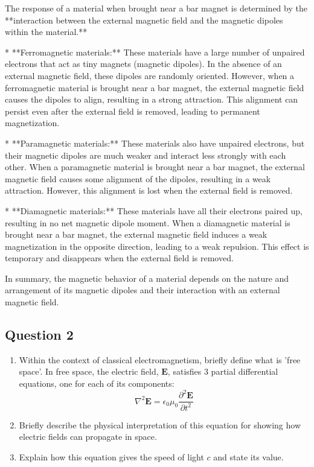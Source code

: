 \documentclass{article}
\begin{document}
The response of a material when brought near a bar magnet is determined by the **interaction between the external magnetic field and the magnetic dipoles within the material.**

* **Ferromagnetic materials:** These materials have a large number of unpaired electrons that act as tiny magnets (magnetic dipoles). In the absence of an external magnetic field, these dipoles are randomly oriented. However, when a ferromagnetic material is brought near a bar magnet, the external magnetic field causes the dipoles to align, resulting in a strong attraction. This alignment can persist even after the external field is removed, leading to permanent magnetization.

* **Paramagnetic materials:** These materials also have unpaired electrons, but their magnetic dipoles are much weaker and interact less strongly with each other. When a paramagnetic material is brought near a bar magnet, the external magnetic field causes some alignment of the dipoles, resulting in a weak attraction. However, this alignment is lost when the external field is removed.

* **Diamagnetic materials:** These materials have all their electrons paired up, resulting in no net magnetic dipole moment. When a diamagnetic material is brought near a bar magnet, the external magnetic field induces a weak magnetization in the opposite direction, leading to a weak repulsion. This effect is temporary and disappears when the external field is removed.

In summary, the magnetic behavior of a material depends on the nature and arrangement of its magnetic dipoles and their interaction with an external magnetic field.


\subsection{Question 2}

\begin{enumerate}
    \item Within the context of classical electromagnetism, briefly define what is 'free space'. In free space, the electric field, $\mathbf{E}$, satisfies 3 partial differential equations, one for each of its components:
    \[
    \nabla^2 \mathbf{E} = \epsilon_0 \mu_0 \frac{\partial^2 \mathbf{E}}{\partial t^2}
    \]
    \item Briefly describe the physical interpretation of this equation for showing how electric fields can propagate in space.
    \item Explain how this equation gives the speed of light $c$ and state its value.
\end{enumerate}
\end{document}
